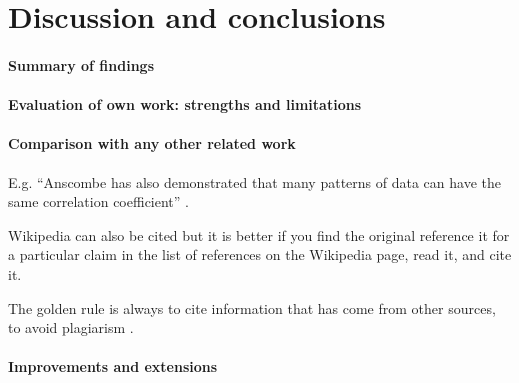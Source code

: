 \documentclass[10pt,a4paper,twocolumn]{article}
\begin{document}



\section{Discussion and conclusions}

\paragraph{Summary of findings}

\paragraph{Evaluation of own work: strengths and limitations}

\paragraph{Comparison with any other related work}
E.g. ``Anscombe has also demonstrated that many patterns of data can
have the same correlation coefficient'' \cite{anscombe1973graphs}.

Wikipedia can also be cited but it is better if you find the original
reference it for a particular claim in the list of references on the
Wikipedia page, read it, and cite it.

The golden rule is always to cite information that has come from other
sources, to avoid plagiarism \cite{wiki:plagarism}. \cite{HowMuchDoesEloMatter}

\paragraph{Improvements and extensions}

\printbibliography
\end{document}
